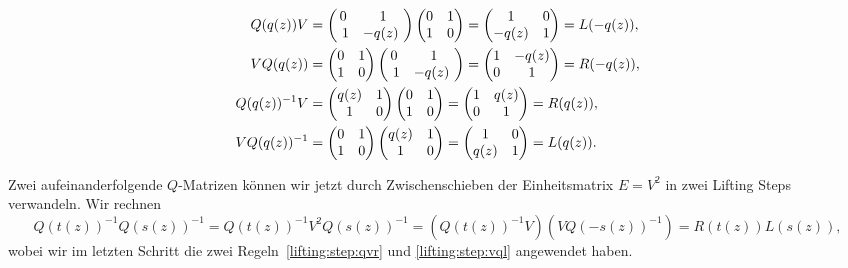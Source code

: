 \begin{align}
Q(q(z))V 
&=
\begin{pmatrix} 0 & 1 \\ 1 & -q(z) \end{pmatrix}
\begin{pmatrix}0&1\\1&0\end{pmatrix}
=
\begin{pmatrix} 1 & 0 \\ -q(z) & 1 \end{pmatrix}
=
L(-q(z)),
\notag
\\
VQ(q(z))
&=
\begin{pmatrix}0&1\\1&0\end{pmatrix}
\begin{pmatrix} 0 & 1 \\ 1 & -q(z) \end{pmatrix}
=
\begin{pmatrix} 1 & -q(z) \\ 0 & 1 \end{pmatrix}
=
R(-q(z)),
\notag
\\
Q(q(z))^{-1}V
&=
\begin{pmatrix} q(z) & 1 \\ 1 & 0 \end{pmatrix}
\begin{pmatrix}0&1\\1&0\end{pmatrix}
=
\begin{pmatrix} 1 & q(z) \\ 0 & 1 \end{pmatrix}
=
R(q(z)),
\label{lifting:step:qvr}
\\
VQ(q(z))^{-1}
&=
\begin{pmatrix}0&1\\1&0\end{pmatrix}
\begin{pmatrix} q(z) & 1 \\ 1 & 0 \end{pmatrix}
=
\begin{pmatrix} 1 & 0 \\ q(z) & 1 \end{pmatrix}
=
L(q(z)).
\label{lifting:step:vql}
\end{align}

Zwei aufeinanderfolgende $Q$-Matrizen können wir jetzt durch Zwischenschieben
der Einheitsmatrix $E=V^2$ in zwei Lifting Steps verwandeln.
Wir rechnen
\begin{equation}
Q(t(z))^{-1}Q(s(z))^{-1}
=
Q(t(z))^{-1}V^2Q(s(z))^{-1}
=
(Q(t(z))^{-1}V)(VQ(-s(z))^{-1})
=
R(t(z)) L(s(z)),
\label{lifting:split}
\end{equation}
wobei wir im letzten Schritt die zwei Regeln~\eqref{lifting:step:qvr}
und \eqref{lifting:step:vql} angewendet haben.

